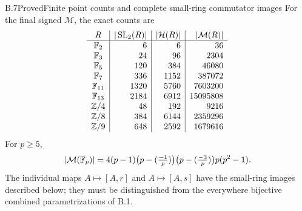 \begin{statement}{B.7}{Proved}{Finite point counts and complete small-ring commutator images}
For the final signed $\mathcal M$, the exact counts are
\[
\begin{array}{c|r|r|r}
R&|\operatorname{SL}_2(R)|&|\mathcal H(R)|&|\mathcal M(R)|\\\hline
\mathbb F_2&6&6&36\\
\mathbb F_3&24&96&2304\\
\mathbb F_5&120&384&46080\\
\mathbb F_7&336&1152&387072\\
\mathbb F_{11}&1320&5760&7603200\\
\mathbb F_{13}&2184&6912&15095808\\
\mathbb Z/4&48&192&9216\\
\mathbb Z/8&384&6144&2359296\\
\mathbb Z/9&648&2592&1679616
\end{array}
\]
For $p\ge5$,
\[
 |\mathcal M(\mathbb F_p)|=
 4(p-1)\bigl(p-(\tfrac{-1}{p})\bigr)
 \bigl(p-(\tfrac{-3}{p})\bigr)p(p^2-1).
\]
The individual maps $A\mapsto[A,r]$ and $A\mapsto[A,s]$
have the small-ring images described below; they must be
distinguished from the everywhere bijective combined
parametrizations of B.1.
\end{statement}
